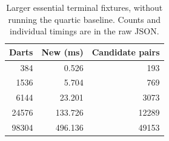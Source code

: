 \begin{table}[htbp]
\centering\small
\setlength{\tabcolsep}{4pt}
\begin{tabular}{rrr}
\toprule
Darts & New (ms) & Candidate pairs \\
\midrule
384 & 0.526 & 193 \\
1536 & 5.704 & 769 \\
6144 & 23.201 & 3073 \\
24576 & 133.726 & 12289 \\
98304 & 496.136 & 49153 \\
\bottomrule
\end{tabular}
\caption{Larger essential terminal fixtures, without running the quartic baseline. Counts and individual timings are in the raw JSON.}
\label{tab:terminal-scaling}
\end{table}
